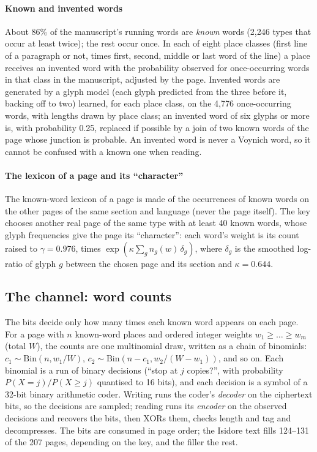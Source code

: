 \paragraph{Known and invented words} About 86\% of the manuscript's running words are \emph{known} words (2{,}246 types
that occur at least twice); the rest occur once. In each of eight place classes (first line of a paragraph or not, times
first, second, middle or last word of the line) a place receives an invented word with the probability observed for
once-occurring words in that class in the manuscript, adjusted by the page. Invented words are generated by a glyph model
(each glyph predicted from the three before it, backing off to two) learned, for each place class, on the 4{,}776
once-occurring words, with lengths drawn by place class; an invented word of six glyphs or more is, with probability 0.25, replaced if possible by
a join of two known words of the page whose junction is probable. An invented word is never a Voynich word,
so it cannot be confused with a known one when reading.

\paragraph{The lexicon of a page and its ``character''} The known-word lexicon of a page is made of the occurrences of
known words on the other pages of the same section and language (never the page itself). The key chooses another real
page of the same type with at least 40 known words, whose glyph frequencies give the page its ``character'': each word's weight is its count raised to
$\gamma = 0.976$, times $\exp(\kappa \sum_g n_g(w)\,\delta_g)$, where $\delta_g$ is the smoothed log-ratio of glyph $g$
between the chosen page and its section and $\kappa = 0.644$.

\subsection{The channel: word counts}

The bits decide only how many times each known word appears on each page. For a page with $n$ known-word places and
ordered integer weights $w_1 \ge \dots \ge w_m$ (total $W$), the counts are one multinomial draw, written as a chain of
binomials: $c_1 \sim \mathrm{Bin}(n, w_1/W)$, $c_2 \sim \mathrm{Bin}(n - c_1, w_2/(W - w_1))$, and so on. Each binomial
is a run of binary decisions (``stop at $j$ copies?'', with probability $P(X = j)/P(X \ge j)$ quantised to 16 bits), and
each decision is a symbol of a 32-bit binary arithmetic coder. Writing runs the coder's \emph{decoder} on the ciphertext
bits, so the decisions are sampled; reading runs its \emph{encoder} on the observed decisions and recovers the bits, then
XORs them, checks length and tag and decompresses. The bits are consumed in page order; the Isidore text fills 124--131
of the 207 pages, depending on the key, and the filler the rest.

